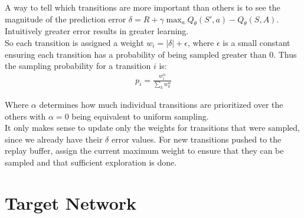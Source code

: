 A way to tell which transitions are more important than others is to see the magnitude of the prediction error $\delta = R + \gamma \max_a Q_{\theta}(S', a) - Q_{\theta}(S, A)$. 
Intuitively greater error results in greater learning.\\

So each transition is assigned a weight $w_i = |\delta| + \epsilon$, where $\epsilon$ is a small constant ensuring each transition has a probability of being sampled greater than 0. Thus the sampling probability for a transition $i$ is:
\begin{align}
    p_i = \frac{w_i^{\alpha}}{\sum_k w^{\alpha}_k}
\end{align}

Where $\alpha$ determines how much individual transitions are prioritized over the others with $\alpha = 0$ being equivalent to uniform sampling.\\

It only makes sense to update only the weights for transitions that were sampled, since we already have their $\delta$ error values\cite{lecture_dqn}. For new transitions pushed to the replay buffer, assign the current maximum weight to ensure that they can be sampled and that sufficient exploration is done.


\section{Target Network }

